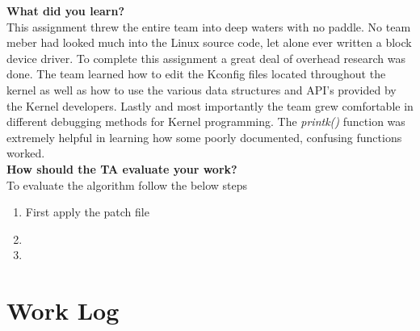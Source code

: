 \documentclass[10pt,onecolumn,draftclsnofoot]{IEEEtran} %
\begin{document}
\begin{singlespace}
\newpage
        \textbf{What did you learn?}\\
        \normalfont \indent This assignment threw the entire team into deep waters with no paddle. No team meber had looked much into the Linux source code, let alone ever written a block device driver. To complete this assignment a great deal of overhead research was done. The team learned how to edit the Kconfig files located throughout the kernel as well as how to use the various data structures and API's provided by the Kernel developers. Lastly and most importantly the team grew comfortable in different debugging methods for Kernel programming. The \textit{printk()} function was extremely helpful in learning how some poorly documented, confusing functions worked.\\

        \textbf{How should the TA evaluate your work?}\\
        \normalfont \indent To evaluate the algorithm follow the below steps
        \begin{enumerate}
                \item First apply the patch file 
                \item
                \item
        \end{enumerate}

\newpage
\section{\bf Work Log}

                

\newpage


\end{singlespace}
\restoregeometry
\end{document}
